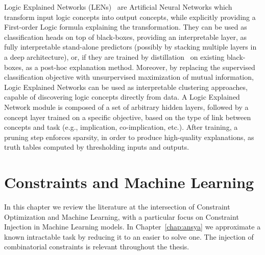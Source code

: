 Logic Explained Networks (LENs)~\cite{ciravegna2023logic} are Artificial Neural Networks which transform input logic concepts into output concepts, while explicitly providing a First-order Logic formula explaining the transformation. They can be used as classification heads on top of black-boxes, providing an interpretable layer, as fully interpretable stand-alone predictors (possibly by stacking multiple layers in a deep architecture), or, if they are trained by distillation~\cite{hinton2015distilling} on existing black-boxes, as a post-hoc explanation method. Moreover, by replacing the supervised classification objective with unsurpervised maximization of mutual information, Logic Explained Networks can be used as interpretable clustering approaches, capable of discovering logic concepts directly from data. 
A Logic Explained Network module is composed of a set of arbitrary hidden layers, followed by a concept layer trained on a specific objective, based on the type of link between concepts and task (e.g., implication, co-implication, etc.). %
After training, a pruning step enforces sparsity, in order to produce high-quality explanations, as truth tables computed by thresholding inputs and outputs.

\chapter{Constraints and Machine Learning}
\label{chap:ciml}

In this chapter we review the literature at the intersection of Constraint Optimization and Machine Learning, with a particular focus on Constraint Injection in Machine Learning models.
In Chapter~\ref{chap:ansya} we approximate a known intractable task by reducing it to an easier to solve one. The injection of combinatorial constraints is relevant throughout the thesis.
